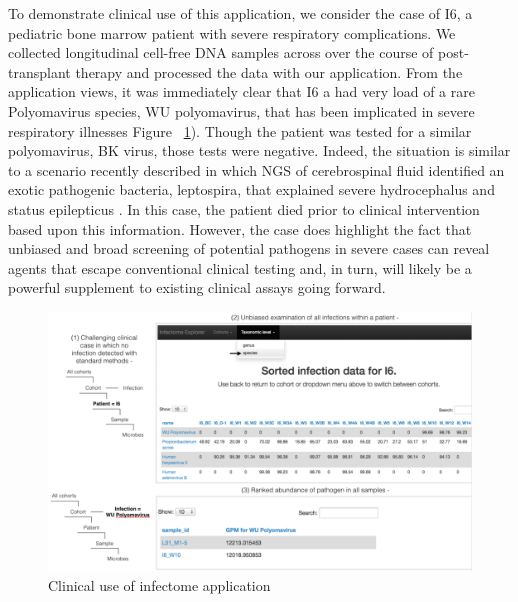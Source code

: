 To demonstrate clinical use of this application, we consider the case of I6, a pediatric bone marrow patient with severe respiratory complications. We collected longitudinal cell-free DNA samples across over the course of post-transplant therapy and processed the data with our application. From the application views, it was immediately clear that I6 a had very load of a rare Polyomavirus species, WU polyomavirus, that has been implicated in severe respiratory illnesses  Figure ~\ref{fig:Fig8}). Though the patient was tested for a similar polyomavirus, BK virus, those tests were negative. Indeed, the situation is similar to a scenario recently described in which NGS of cerebrospinal fluid identified an exotic pathogenic bacteria, leptospira, that explained severe hydrocephalus and status epilepticus \cite{Wilson:2014dv}. In this case, the patient died prior to clinical intervention based upon this information. However, the case does highlight the fact that unbiased and broad screening of potential pathogens in severe cases can reveal agents that escape conventional clinical testing and, in turn, will likely be a powerful supplement to existing clinical assays going forward.

\begin{figure}
\center\includegraphics[width=150mm,scale=0.5]{Figures/Fig8}
\caption{Clinical use of infectome application}
\label{fig:Fig8}
\end{figure}

